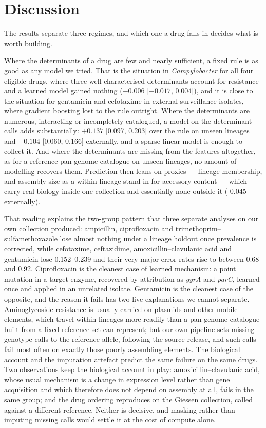 \section*{Discussion}

The results separate three regimes, and which one a drug falls in decides what is worth building.

Where the determinants of a drug are few and nearly sufficient, a fixed rule is as good as any
model we tried. That is the situation in \textit{Campylobacter} for all four eligible drugs, where
three well-characterised determinants account for resistance and a learned model gained nothing
($-0.006$ [$-0.017$, 0.004]), and it is close to the situation for gentamicin and cefotaxime in
external surveillance isolates, where gradient boosting lost to the rule outright. Where the
determinants are numerous, interacting or incompletely catalogued, a model on the determinant calls
adds substantially: $+0.137$ [0.097, 0.203] over the rule on unseen \Ecoli{} lineages and $+0.104$
[0.060, 0.166] externally, and a sparse linear model is enough to collect it. And where the
determinants are missing from the features altogether, as for a reference pan-genome catalogue on
unseen lineages, no amount of modelling recovers them. Prediction then leans on proxies --- lineage
membership, and assembly size as a within-lineage stand-in for accessory content --- which carry
real biology inside one collection and essentially none outside it (\nap{} 0.045 externally).

That reading explains the two-group pattern that three separate analyses on our own collection
produced: ampicillin, ciprofloxacin and trimethoprim--sulfamethoxazole lose almost nothing under a
lineage holdout once prevalence is corrected, while cefotaxime, ceftazidime,
amoxicillin--clavulanic acid and gentamicin lose 0.152--0.239 and their very major error rates rise
to between 0.68 and 0.92. Ciprofloxacin is the cleanest case of learned mechanism: a point mutation
in a target enzyme, recovered by attribution as \textit{gyrA} and \textit{parC}, learned once and
applied in an unrelated isolate. Gentamicin is the cleanest case of the opposite, and the reason it
fails has two live explanations we cannot separate. Aminoglycoside resistance is usually carried on
plasmids and other mobile elements, which travel within lineages more readily than a pan-genome
catalogue built from a fixed reference set can represent; but our own pipeline sets missing genotype
calls to the reference allele, following the source release, and such calls fail most often on
exactly those poorly assembling elements. The biological account and the imputation artefact
predict the same failure on the same drugs. Two observations keep the biological account in play:
amoxicillin--clavulanic acid, whose usual mechanism is a change in expression level rather than
gene acquisition and which therefore does not depend on assembly at all, fails in the same group;
and the drug ordering reproduces on the Giessen collection, called against a different reference.
Neither is decisive, and masking rather than imputing missing calls would settle it at the cost of
compute alone.

